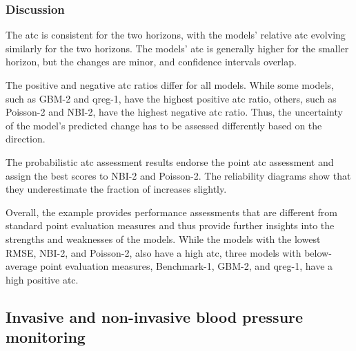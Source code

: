 \documentclass[pdflatex]{sn-jnl}
\theoremstyle{plain}%
\theoremstyle{definition}
\begin{document}
\subsubsection*{Discussion}

The \ac{atc} is consistent for the two horizons, with the models' relative \ac{atc} evolving similarly for the two horizons.
The models' \ac{atc} is generally higher for the smaller horizon, but the changes are minor, and confidence intervals overlap.

The positive and negative \ac{atc} ratios differ for all models.
While some models, such as GBM-2 and qreg-1, have the highest positive \ac{atc} ratio, others, such as Poisson-2 and NBI-2, have the highest negative \ac{atc} ratio.
Thus, the uncertainty of the model's predicted change has to be assessed differently based on the direction.

The probabilistic \ac{atc} assessment results endorse the point \ac{atc} assessment and assign the best scores to NBI-2 and Poisson-2.
The reliability diagrams show that they underestimate the fraction of increases slightly.

Overall, the example provides performance assessments that are different from standard point evaluation measures and thus provide further insights into the strengths and weaknesses of the models.
While the models with the lowest RMSE, NBI-2, and Poisson-2, also have a high \ac{atc}, three models with below-average point evaluation measures, Benchmark-1, GBM-2, and qreg-1, have a high positive \ac{atc}.


\subsection{Invasive and non-invasive blood pressure monitoring} \label{sec:application_measurement}
\end{document}
